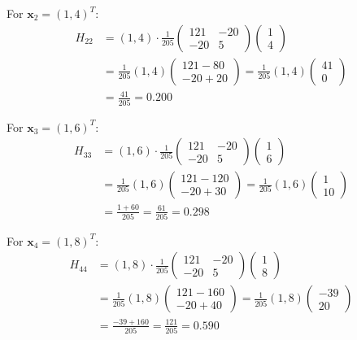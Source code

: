 \documentclass[12pt]{article}
\begin{document}
\begin{solution}
For $\mathbf{x}_2 = (1, 4)^T$:
\begin{align*}
H_{22} &= (1, 4) \cdot \frac{1}{205}\begin{pmatrix} 121 & -20 \\ -20 & 5 \end{pmatrix} \begin{pmatrix} 1 \\ 4 \end{pmatrix} \\
&= \frac{1}{205}(1, 4)\begin{pmatrix} 121 - 80 \\ -20 + 20 \end{pmatrix} = \frac{1}{205}(1, 4)\begin{pmatrix} 41 \\ 0 \end{pmatrix} \\
&= \frac{41}{205} = 0.200
\end{align*}

For $\mathbf{x}_3 = (1, 6)^T$:
\begin{align*}
H_{33} &= (1, 6) \cdot \frac{1}{205}\begin{pmatrix} 121 & -20 \\ -20 & 5 \end{pmatrix} \begin{pmatrix} 1 \\ 6 \end{pmatrix} \\
&= \frac{1}{205}(1, 6)\begin{pmatrix} 121 - 120 \\ -20 + 30 \end{pmatrix} = \frac{1}{205}(1, 6)\begin{pmatrix} 1 \\ 10 \end{pmatrix} \\
&= \frac{1 + 60}{205} = \frac{61}{205} = 0.298
\end{align*}

For $\mathbf{x}_4 = (1, 8)^T$:
\begin{align*}
H_{44} &= (1, 8) \cdot \frac{1}{205}\begin{pmatrix} 121 & -20 \\ -20 & 5 \end{pmatrix} \begin{pmatrix} 1 \\ 8 \end{pmatrix} \\
&= \frac{1}{205}(1, 8)\begin{pmatrix} 121 - 160 \\ -20 + 40 \end{pmatrix} = \frac{1}{205}(1, 8)\begin{pmatrix} -39 \\ 20 \end{pmatrix} \\
&= \frac{-39 + 160}{205} = \frac{121}{205} = 0.590
\end{align*}


\end{solution}
\end{document}
